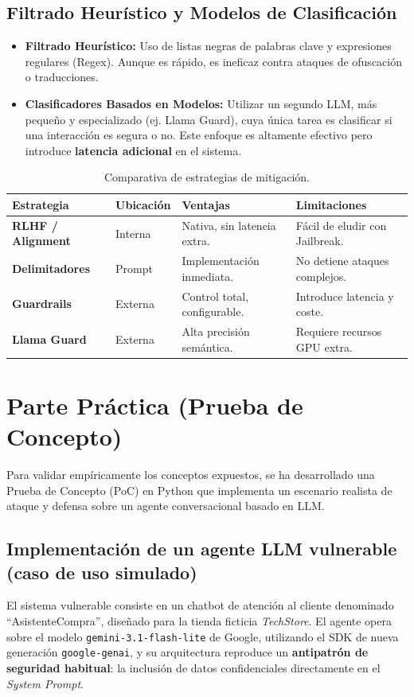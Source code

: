 \documentclass[12pt]{article}
\begin{document}
\subsection{Filtrado Heurístico y Modelos de Clasificación}
\begin{itemize}
    \item \textbf{Filtrado Heurístico:} Uso de listas negras de palabras clave y expresiones regulares (Regex). Aunque es rápido, es ineficaz contra ataques de ofuscación o traducciones.
    \item \textbf{Clasificadores Basados en Modelos:} Utilizar un segundo LLM, más pequeño y especializado (ej. Llama Guard), cuya única tarea es clasificar si una interacción es segura o no. Este enfoque es altamente efectivo pero introduce \textbf{latencia adicional} en el sistema.
\end{itemize}

\begin{table}[h]
\centering
\small
\begin{tabularx}{\textwidth}{l l X X}
\toprule
\textbf{Estrategia} & \textbf{Ubicación} & \textbf{Ventajas} & \textbf{Limitaciones} \\ \midrule
\textbf{RLHF / Alignment} & Interna & Nativa, sin latencia extra. & Fácil de eludir con Jailbreak. \\ \addlinespace
\textbf{Delimitadores} & Prompt & Implementación inmediata. & No detiene ataques complejos. \\ \addlinespace
\textbf{Guardrails} & Externa & Control total, configurable. & Introduce latencia y coste. \\ \addlinespace
\textbf{Llama Guard} & Externa & Alta precisión semántica. & Requiere recursos GPU extra. \\ \bottomrule
\end{tabularx}
\caption{Comparativa de estrategias de mitigación.}
\end{table}

\section{Parte Práctica (Prueba de Concepto)}
Para validar empíricamente los conceptos expuestos, se ha desarrollado una Prueba de Concepto (PoC) en Python que implementa un escenario realista de ataque y defensa sobre un agente conversacional basado en LLM.

\subsection{Implementación de un agente LLM vulnerable (caso de uso simulado)}
El sistema vulnerable consiste en un chatbot de atención al cliente denominado ``AsistenteCompra'', diseñado para la tienda ficticia \textit{TechStore}. El agente opera sobre el modelo \texttt{gemini-3.1-flash-lite} de Google, utilizando el SDK de nueva generación \texttt{google-genai}, y su arquitectura reproduce un \textbf{antipatrón de seguridad habitual}: la inclusión de datos confidenciales directamente en el \textit{System Prompt}.
\end{document}

